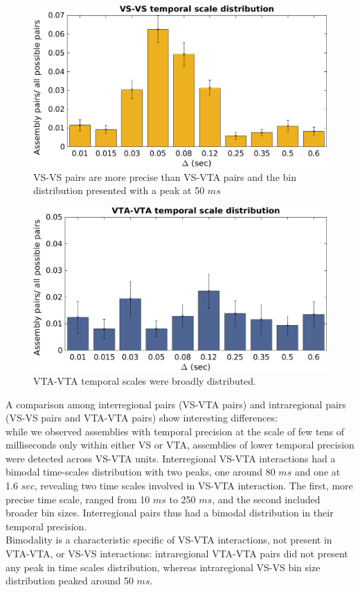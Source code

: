 \begin{figure}[H]
\centering
\includegraphics[scale=0.46]{figures/VS_VS_S.png}
\caption{VS-VS pairs are more precise than VS-VTA pairs and the bin distribution presented with a peak at 50 $ms$}
\label{fig:BinDistrVS}
\end{figure}
\begin{figure}[H]
\centering
\includegraphics[scale=0.46]{figures/VTA_VTA_S.png}
\caption{VTA-VTA temporal scales were broadly distributed.}
\label{fig:BinDistrVTA}
\end{figure}
A comparison among interregional pairs (VS-VTA pairs) and intraregional pairs (VS-VS pairs and VTA-VTA pairs) show interesting differences:\\
while we observed assemblies with temporal precision at the scale of few tens of milliseconds only within either VS or VTA, assemblies of lower temporal precision were detected across VS-VTA units. Interregional VS-VTA interactions had a bimodal time-scales distribution with two peaks, one around 80 $ms$ and one at 1.6 $sec$, revealing two time scales involved in VS-VTA interaction. The first, more precise time scale, ranged from 10 $ms$ to 250 $ms$, and the second included broader bin sizes. Interregional pairs thus had a bimodal distribution in their temporal precision.\\Bimodality is a characteristic specific of VS-VTA interactions, not present in VTA-VTA, or VS-VS interactions: intraregional VTA-VTA pairs did not present any peak in time scales distribution, whereas intraregional VS-VS bin size distribution peaked around 50 $ms$.  
